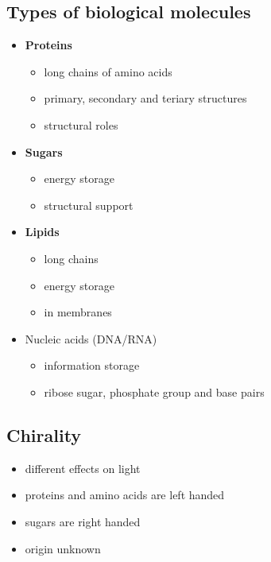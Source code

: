 \documentclass{article}
\theoremstyle{sltheorem}
\begin{document}
\subsection{Types of biological molecules}
\begin{itemize}
    \item \textbf{Proteins}
    \begin{itemize}
        \item long chains of amino acids
        \item primary, secondary and teriary structures
        \item structural roles
    \end{itemize}
    \item \textbf{Sugars}
    \begin{itemize}
        \item energy storage
        \item structural support
    \end{itemize}
    \item \textbf{Lipids}
    \begin{itemize}
        \item long chains
        \item energy storage
        \item in membranes
    \end{itemize}
    \item Nucleic acids (DNA/RNA)
    \begin{itemize}
        \item information storage
        \item ribose sugar, phosphate group and base pairs 
    \end{itemize}
\end{itemize}
\subsection{Chirality}
\begin{itemize}
    \item different effects on light
    \item proteins and amino acids are left handed
    \item sugars are right handed
    \item origin unknown
\end{itemize}
\end{document}
